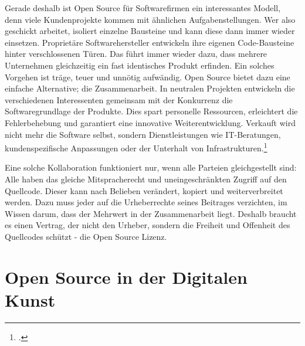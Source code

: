 \documentclass[
paper=164mm:234mm, %
pagesize, %
DIV=calc, %
10pt, %
parskip=half- %
]{scrbook}
\begin{document}
Gerade deshalb ist Open Source für Softwarefirmen ein interessantes Modell, denn viele Kundenprojekte kommen mit ähnlichen Aufgabenstellungen. Wer also geschickt arbeitet, isoliert einzelne Bausteine und kann diese dann immer wieder einsetzen. Proprietäre Softwarehersteller entwickeln ihre eigenen Code-Bausteine hinter verschlossenen Türen. Das führt immer wieder dazu, dass mehrere Unternehmen gleichzeitig ein fast identisches Produkt erfinden. Ein solches Vorgehen ist träge, teuer und unnötig aufwändig. Open Source bietet dazu eine einfache Alternative; die Zusammenarbeit. In neutralen Projekten entwickeln die verschiedenen Interessenten gemeinsam mit der Konkurrenz die Softwaregrundlage der Produkte. Dies spart personelle Ressourcen, erleichtert die Fehlerbehebung und garantiert eine innovative Weiterentwicklung. Verkauft wird nicht mehr die Software selbst, sondern Dienstleistungen wie IT-Beratungen, kundenspezifische Anpassungen oder der Unterhalt von Infrastrukturen.\footnote{\cite[329-357]{Grassmuck:2004}.}

Eine solche Kollaboration funktioniert nur, wenn alle Parteien gleichgestellt sind: Alle haben das gleiche Mitspracherecht und uneingeschränkten Zugriff auf den Quellcode. Dieser kann nach Belieben verändert, kopiert und weiterverbreitet werden. Dazu muss jeder auf die Urheberrechte seines Beitrages verzichten, im Wissen darum, dass der Mehrwert in der Zusammenarbeit liegt. Deshalb braucht es einen Vertrag, der nicht den Urheber, sondern die Freiheit und Offenheit des Quellcodes schützt - die Open Source Lizenz.


{}
\chapter*{Open Source in der Digitalen Kunst}
\end{document}
